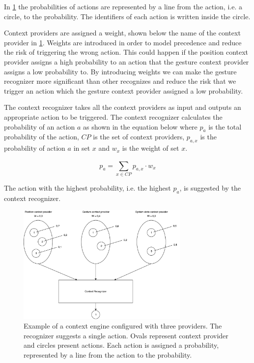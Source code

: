 In \cref{fig:design:context-engine:single-suggestion} the probabilities of actions are represented by a line from the action, i.e. a circle, to the probability. The identifiers of each action is written inside the circle. 

Context providers are assigned a weight, shown below the name of the context provider in \cref{fig:design:context-engine:single-suggestion}. Weights are introduced in order ​to​ model precedence and reduce the risk of triggering the wrong action. This could happen if the position context provider assigns a high probability to an action that the gesture context provider assigns a low probability to. By introducing weights we can make the gesture recognizer more significant than other recognizes and reduce the risk that we trigger an action which the gesture context provider assigned a low probability.

The context recognizer takes all the context providers as input and outputs an appropriate action to be triggered. The context recognizer calculates the probability of an action $a$ as shown in the equation below where $p_a$ is the total probability of the action, $CP$ is the set of context providers, $p_{a,x}$ is the probability of action $a$ in set $x$ and $w_x$ is the weight of set $x$.

\begin{equation*}
p_a = \sum\limits_{x \in CP}^{} p_{a,x} \cdot w_{x}
\end{equation*}

The action with the highest probability, i.e. the highest $p_a$, is suggested by the context recognizer.

\begin{figure}[h!]
\centering
\includegraphics[width=0.75\textwidth]{images/context-engine-single-suggestion}
\caption{Example of a context engine configured with three providers. The recognizer suggests a single action. Ovals represent context provider and circles present actions. Each action is assigned a probability, represented by a line from the action to the probability.}
\label{fig:design:context-engine:single-suggestion}
\end{figure}

